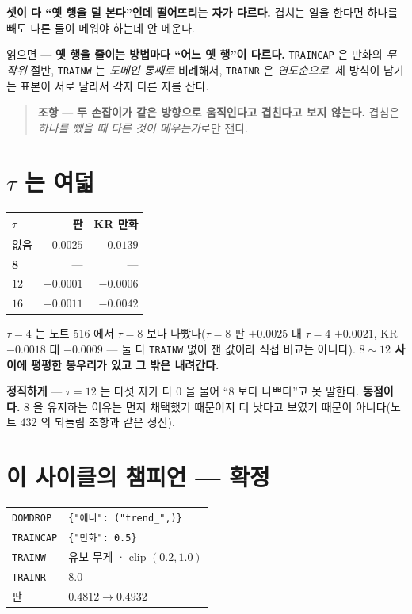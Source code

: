 \documentclass[11pt]{article}
\begin{document}
\textbf{셋이 다 ``옛 행을 덜 본다''인데 떨어뜨리는 자가 다르다.} 겹치는
일을 한다면 하나를 빼도 다른 둘이 메워야 하는데 안 메운다.

읽으면 --- \textbf{옛 행을 줄이는 방법마다 ``어느 옛 행''이 다르다.}
\texttt{TRAINCAP} 은 만화의 \emph{무작위} 절반, \texttt{TRAINW} 는
\emph{도메인 통째로} 비례해서, \texttt{TRAINR} 은 \emph{연도순으로}.
세 방식이 남기는 표본이 서로 달라서 각자 다른 자를 산다.

\begin{quote}
\textbf{조항} --- \textbf{두 손잡이가 같은 방향으로 움직인다고 겹친다고
보지 않는다.} 겹침은 \emph{하나를 뺐을 때 다른 것이 메우는가}로만 잰다.
\end{quote}

\section{$\tau$ 는 여덟}

\begin{center}
\begin{tabular}{lrr}
\hline
$\tau$ & 판 & KR 만화 \\
\hline
없음 & $-0.0025$ & $-0.0139$ \\
$\mathbf{8}$ & --- & --- \\
$12$ & $-0.0001$ & $-0.0006$ \\
$16$ & $-0.0011$ & $-0.0042$ \\
\hline
\end{tabular}
\end{center}

$\tau{=}4$ 는 노트 516 에서 $\tau{=}8$ 보다 나빴다($\tau{=}8$ 판
$+0.0025$ 대 $\tau{=}4$ $+0.0021$, KR $-0.0018$ 대 $-0.0009$ --- 둘 다
\texttt{TRAINW} 없이 잰 값이라 직접 비교는 아니다). \textbf{$8 \sim 12$
사이에 평평한 봉우리가 있고 그 밖은 내려간다.}

\textbf{정직하게} --- $\tau{=}12$ 는 다섯 자가 다 $0$ 을 물어 ``$8$ 보다
나쁘다''고 못 말한다. \textbf{동점이다.} $8$ 을 유지하는 이유는 먼저
채택했기 때문이지 더 낫다고 보였기 때문이 아니다(노트 432 의 되돌림 조항과
같은 정신).

\section*{이 사이클의 챔피언 --- 확정}

\begin{center}
\begin{tabular}{ll}
\hline
\texttt{DOMDROP} & \texttt{\{"애니": ("trend\_",)\}} \\
\texttt{TRAINCAP} & \texttt{\{"만화": 0.5\}} \\
\texttt{TRAINW} & 유보 무게 · clip $(0.2, 1.0)$ \\
\texttt{TRAINR} & $8.0$ \\
\hline
판 & $0.4812 \to \mathbf{0.4932}$ \\
\hline
\end{tabular}
\end{center}
\end{document}
